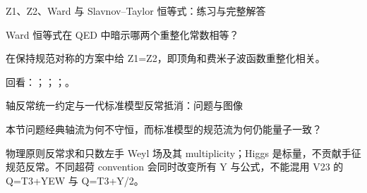 \begin{frame}[t]{Z1、Z2、Ward 与 Slavnov--Taylor 恒等式：练习与完整解答}
\footnotesize
\begin{block}{}Ward 恒等式在 QED 中暗示哪两个重整化常数相等？\end{block}
\begin{exampleblock}{}在保持规范对称的方案中给 Z1=Z2，即顶角和费米子波函数重整化相关。\end{exampleblock}
\vfill
\scriptsize 回看：；；；。
\end{frame}

\begin{frame}[t]{轴反常统一约定与一代标准模型反常抵消：问题与图像}
\footnotesize
\begin{block}{本节问题}经典轴流为何不守恒，而标准模型的规范流为何仍能量子一致？\end{block}
\begin{block}{物理原则}\quad 反常求和只数左手 Weyl 场及其 multiplicity；Higgs 是标量，不贡献手征规范反常。不同超荷 convention 会同时改变所有 Y 与公式，不能混用 V23 的 Q=T3+YEW 与 Q=T3+Y/\allowbreak{}2。\end{block}
\end{frame}

